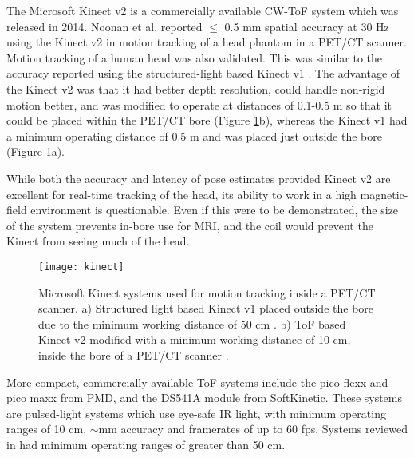 \documentclass[class=article, crop=false]{standalone}
\begin{document}
\par 
The Microsoft Kinect v2 is a commercially available CW-ToF system which was released in 2014. Noonan et al. \parencite*{Noonan2015} reported $\leq$ 0.5 mm spatial accuracy at 30 Hz using the Kinect v2 in motion tracking of a head phantom in a PET/CT scanner. Motion tracking of a human head was also validated. This was similar to the accuracy reported using the structured-light based Kinect v1 \parencite{Noonan2012}. The advantage of the Kinect v2 was that it had better depth resolution, could handle non-rigid motion better, and was modified to operate at distances of 0.1-0.5 m so that it could be placed within the PET/CT bore (Figure \ref{kinect}b), whereas the Kinect v1 had a minimum operating distance of 0.5 m and was placed just outside the bore (Figure \ref{kinect}a). 
\par 
While both the accuracy and latency of pose estimates provided Kinect v2 are excellent for real-time tracking of the head, its ability to work in a high magnetic-field environment is questionable. Even if this were to be demonstrated, the size of the system prevents in-bore use for MRI, and the coil would prevent the Kinect from seeing much of the head.

\begin{figure}[!h]
	\centering
	\texttt{[image: kinect]}
	\caption{Microsoft Kinect systems used for motion tracking inside a PET/CT scanner. a) Structured light based Kinect v1 placed outside the bore due to the minimum working distance of 50 cm \parencite{Noonan2012}. b) ToF based Kinect v2 modified with a minimum working distance of 10 cm, inside the bore of a PET/CT scanner \parencite{Noonan2015}.}
	\label{kinect}
\end{figure}

\par 
More compact, commercially available ToF systems include the pico flexx and pico maxx from PMD, and the DS541A module from SoftKinetic. These systems are pulsed-light systems which use eye-safe IR light, with minimum operating ranges of 10 cm, $\sim$mm accuracy and framerates of up to 60 fps. Systems reviewed in \parencite{Horaud2016} had minimum operating ranges of greater than 50 cm.
\end{document}
